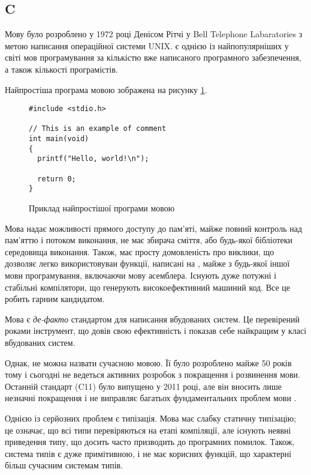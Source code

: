\documentclass[main.tex]{subfiles}
\begin{document}
\subsection{C}

Мову \LangC{} було розроблено у 1972 році Денісом Рітчі у Bell Telephone Labaratories з метою написання операційної системи UNIX\cite{stewart-bill:history-of-c}. \LangC{} є однією із найпопулярніших у світі мов програмування за кількістю вже написаного програмного забезпечення, а також кількості програмістів.

Найпростіша програма мовою \LangC{} зображена на рисунку \ref{example:c}.

\begin{figure}[h]
  \centering
  \begin{verbatim}
#include <stdio.h>

// This is an example of comment
int main(void)
{
  printf("Hello, world!\n");

  return 0;
}
  \end{verbatim}
  \caption{Приклад найпростішої програми мовою \LangC{}}
  \label{example:c}
\end{figure}

Мова \LangC{} надає можливості прямого доступу до пам'яті, майже повний контроль над пам'яттю і потоком виконання, не має збирача сміття, або будь-якої бібліотеки середовища виконання. Також, \LangC{} має просту домовленість про виклики, що дозволяє легко використовуваи функції, написані на \LangC{}, майже з будь-якої іншої мови програмування, включаючи мову асемблера. Існують дуже потужні і стабільні компілятори, що генерують високоефективний машиний код. Все це робить \LangC{} гарним кандидатом.

Мова \LangC{} є \emph{де-факто} стандартом для написання вбудованих систем. Це перевірений роками інструмент, що довів свою ефективність і показав себе найкращим у класі вбудованих систем.

Однак, \LangC{} не можна назвати сучасною мовою. Її було розроблено майже 50 років тому і сьогодні не ведеться активних розробок з покращення і розвинення мови. Останній стандарт (C11) було випущено у 2011 році, але він вносить лише незначні покращення і не виправляє багатьох фундаментальних проблем мови \LangC{}.

Однією із серйозних проблем \LangC{} є типізація. Мова \LangC{} має слабку статичну типізацію; це означає, що всі типи перевіряються на етапі компіляції, але існують неявні приведення типу, що досить часто призводить до програмних помилок. Також, система типів є дуже примітивною, і не має корисних функцій, що характерні більш сучасним системам типів.
\end{document}
